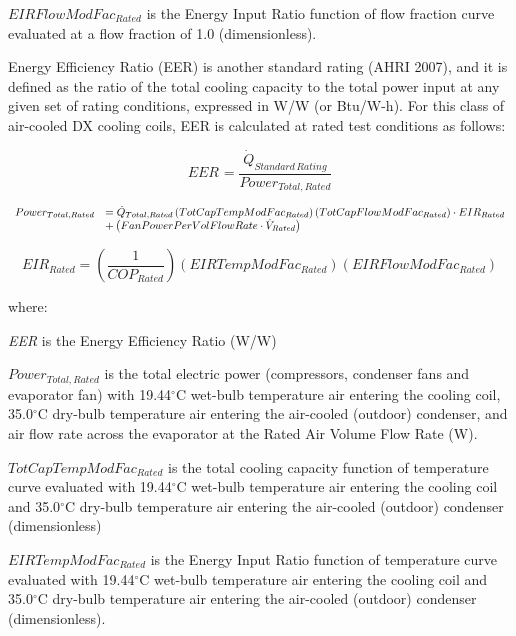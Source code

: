 \(EIRFlowModFa{c_{Rated}}\) is the Energy Input Ratio function of flow fraction curve evaluated at a flow fraction of 1.0 (dimensionless).

Energy Efficiency Ratio (EER) is another standard rating (AHRI 2007), and it is defined as the ratio of the total cooling capacity to the total power input at any given set of rating conditions, expressed in W/W (or Btu/W-h). For this class of air-cooled DX cooling coils, EER is calculated at rated test conditions as follows:

\begin{equation}
EE{R_{}} = \frac{{{{\dot Q}_{Standard\,Rating}}}}{{Powe{r_{Total,Rated}}}}
\end{equation}

\begin{equation}
  \begin{array}{rl}
    Power_{Total,Rated} &= \dot{Q}_{Total,Rated} \left(TotCapTempModFac_{Rated}\right)\left(TotCapFlowModFac_{Rated}\right)\cdot EIR_{Rated} \\
                        &+ \left(FanPowerPerVolFlowRate \cdot \dot{V}_{Rated}\right)
  \end{array}
\end{equation}

\begin{equation}
EI{R_{Rated}} = \left( {\frac{1}{{CO{P_{Rated}}}}} \right)(EIRTempModFa{c_{Rated}})(EIRFlowModFa{c_{Rated}})
\end{equation}

where:

\emph{EER} is the Energy Efficiency Ratio (W/W)

\(Powe{r_{Total,Rated}}\) is the total electric power (compressors, condenser fans and evaporator fan) with 19.44\(^{\circ}\)C wet-bulb temperature air entering the cooling coil, 35.0\(^{\circ}\)C dry-bulb temperature air entering the air-cooled (outdoor) condenser, and air flow rate across the evaporator at the Rated Air Volume Flow Rate (W).

\(TotCapTempModFa{c_{Rated}}\) is the total cooling capacity function of temperature curve evaluated with 19.44\(^{\circ}\)C wet-bulb temperature air entering the cooling coil and 35.0\(^{\circ}\)C dry-bulb temperature air entering the air-cooled (outdoor) condenser (dimensionless)

\(EIRTempModFa{c_{Rated}}\) is the Energy Input Ratio function of temperature curve evaluated with 19.44\(^{\circ}\)C wet-bulb temperature air entering the cooling coil and 35.0\(^{\circ}\)C dry-bulb temperature air entering the air-cooled (outdoor) condenser (dimensionless).

